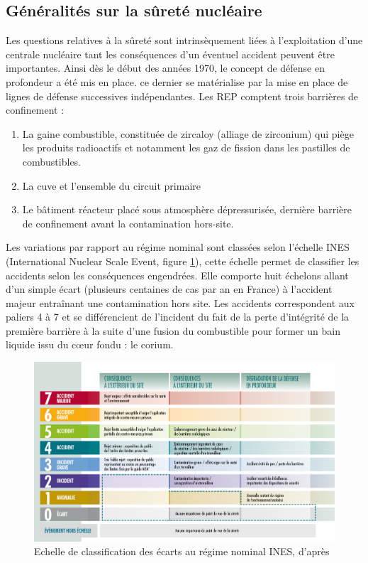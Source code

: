 \subsection{Généralités sur la sûreté nucléaire}

Les questions relatives à la sûreté sont intrinsèquement liées à l'exploitation d'une centrale nucléaire tant les conséquences d'un éventuel accident peuvent être importantes. Ainsi dès le début des années 1970, le concept de défense en profondeur a été mis en place. ce dernier se matérialise par la mise en place de lignes de défense successives indépendantes. Les REP comptent trois barrières de confinement :
\begin{enumerate}
	\item La gaine combustible, constituée de zircaloy (alliage de zirconium) qui piège les produits radioactifs et notamment les gaz de fission dans les pastilles de combustibles.
	\item La cuve et l'ensemble du circuit primaire
	\item Le bâtiment réacteur placé sous atmosphère dépressurisée, dernière barrière de confinement avant la contamination hors-site.
\end{enumerate}
Les variations par rapport au régime nominal sont classées selon l'échelle INES (International Nuclear Scale Event, figure \ref{fig:echelle-ines-article}), cette échelle permet de classifier les accidents selon les conséquences engendrées. Elle comporte huit échelons allant d'un simple écart (plusieurs centaines de cas par an en France) à l'accident majeur entraînant une contamination hors site. Les accidents correspondent aux paliers 4 à 7 et se différencient de l'incident du fait de la perte d'intégrité de la première barrière à la suite d'une fusion du combustible pour former un bain liquide issu du c\oe ur fondu : le corium.
\begin{figure}[H]
	\centering
	\includegraphics[width=0.7\linewidth]{figure/echelle-ines-article}
	\caption[Echelle de classification des écarts au régime nominal INES]{Echelle de classification des écarts au régime nominal INES, d'après \cite{noauthor_ines_2011}}
	\label{fig:echelle-ines-article}
\end{figure}
